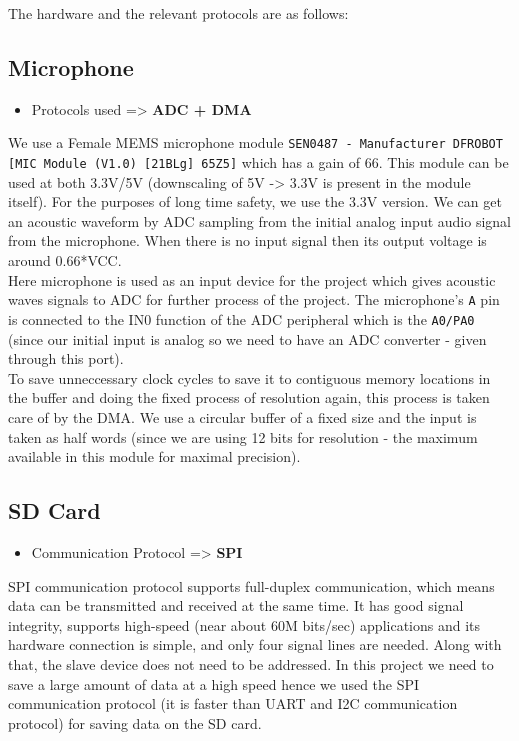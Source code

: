 \documentclass[11pt]{article}
\begin{document}
The hardware and the relevant protocols are as follows:
\subsection{Microphone}
\label{sec:org20deace}

\begin{itemize}
\item Protocols used => \textbf{ADC + DMA}
\end{itemize}

We use a Female MEMS microphone module \texttt{SEN0487 - Manufacturer DFROBOT [MIC Module (V1.0) [21BLg] 65Z5]} which has a gain of 66. This module can be used at both 3.3V/5V (downscaling of 5V -> 3.3V is present in the module itself). For the purposes of long time safety, we use the 3.3V version. We can get an acoustic waveform by ADC sampling from the initial analog input audio signal from the microphone. When there is no input signal then its output voltage is around 0.66*VCC. \\[0pt]

Here microphone is used as an input device for the project which gives acoustic waves signals to ADC for further process of the project. The microphone’s \texttt{A} pin is connected to the IN0 function of the ADC peripheral which is the \texttt{A0/PA0} (since our initial input is analog so we need to have an ADC converter - given through this port). \\[0pt]

To save unneccessary clock cycles to save it to contiguous memory locations in the buffer and doing the fixed process of resolution again, this process is taken care of by the DMA. We use a circular buffer of a fixed size and the input is taken as half words (since we are using 12 bits for resolution - the maximum available in this module for maximal precision).


\subsection{SD Card}
\label{sec:orgdced61d}

\begin{itemize}
\item Communication Protocol => \textbf{SPI}
\end{itemize}

SPI communication protocol supports full-duplex communication, which means data can be transmitted and received at the same time. It has good signal integrity, supports high-speed (near about 60M bits/sec) applications and its hardware connection is simple, and only four signal lines are needed. Along with that, the slave device does not need to be addressed. In this project we need to save a large amount of data at a high speed hence we used the SPI communication protocol (it is faster than UART and I2C communication protocol) for saving data on the SD card. \\[0pt]
\end{document}
